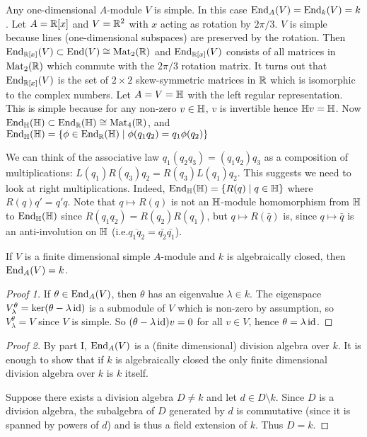\begin{exam}
	\leavevmode
	\begin{enum}
		\io Any one-dimensional $A$-module $V$ is simple.
		In this case $\operatorname{End}_A(V) = \operatorname{End}_k(V) = k$.
		\io Let $A=\mathbb{R}[x]$ and $V=\mathbb{R}^2$ with $x$ acting as rotation by $2\pi/3$.
		$V$ is simple because lines (one-dimensional subspaces) are preserved by the rotation.
		Then $\operatorname{End}_{\mathbb{R}[x]}(V) \subset \operatorname{End}(V) \cong \operatorname{Mat}_2(\mathbb{R})$ and $\operatorname{End}_{\mathbb{R}[x]}(V)$ consists of all matrices in $\operatorname{Mat}_2(\mathbb{R})$ which commute with the $2\pi/3$ rotation matrix.
		It turns out that $\operatorname{End}_{\mathbb{R}[x]}(V)$ is the set of $2 \times 2$ skew-symmetric matrices in $\mathbb{R}$ which is isomorphic to the complex numbers.
		\io Let $A=V=\mathbb{H}$ with the left regular representation.
		This is simple because for any non-zero $v \in \mathbb{H}$, $v$ is invertible hence $\mathbb{H} v = \mathbb{H}$.
		Now $\operatorname{End}_{\mathbb{H}}(\mathbb{H}) \subset \operatorname{End}_{\mathbb{R}}(\mathbb{H}) \cong \operatorname{Mat}_4(\mathbb{R})$, and $\operatorname{End}_{\mathbb{H}}(\mathbb{H}) = \{\phi \in \operatorname{End}_{\mathbb{R}}(\mathbb{H}) \mid \phi(q_1q_2) = q_1\phi(q_2)\}$
		
		We can think of the associative law $q_1(q_2q_3)=(q_1q_2)q_3$ as a composition of multiplications: $L(q_1)R(q_3)q_2=R(q_3)L(q_1)q_2$.
		This suggests we need to look at right multiplications.
		Indeed, $\operatorname{End}_{\mathbb{H}}(\mathbb{H}) = \{R(q) \mid q \in \mathbb{H}\}$ where $R(q)q' = q'q$.
		Note that $q \mapsto R(q)$ is not an $\mathbb{H}$-module homomorphism from $\mathbb{H}$ to $\operatorname{End}_{\mathbb{H}}(\mathbb{H})$ since $R(q_1q_2)=R(q_2)R(q_1)$, but $q \mapsto R(\bar{q})$ is, since $q \mapsto \bar q$ is an anti-involution on $\mathbb{H}$ (i.e.\@ $\overline{q_1q_2}=\bar{q_2}\bar{q_1}$).
	\end{enum}
\end{exam}

\begin{thm}
	If $V$ is a finite dimensional simple $A$-module and $k$ is algebraically closed, then $\operatorname{End}_A(V)=k$.
\end{thm}

\begin{proof}[Proof 1]
	If $\theta \in \operatorname{End}_A(V)$, then $\theta$ has an eigenvalue $\lambda \in k$.
	The eigenspace $V_\lambda^\theta = \ker(\theta-\lambda\operatorname{id})$ is a submodule of $V$ which is non-zero by assumption, so $V_\lambda^\theta=V$ since $V$ is simple.
	So $(\theta-\lambda\operatorname{id})v=0$ for all $v \in V$, hence $\theta=\lambda\operatorname{id}$.
\end{proof}

\begin{proof}[Proof 2]
	By part I, $\operatorname{End}_A(V)$ is a (finite dimensional) division algebra over $k$.
	It is enough to show that if $k$ is algebraically closed the only finite dimensional division algebra over $k$ is $k$ itself.
	
	Suppose there exists a division algebra $D \neq k$ and let $d \in D \setminus k$.
	Since $D$ is a division algebra, the subalgebra of $D$ generated by $d$ is commutative (since it is spanned by powers of $d$) and is thus a field extension of $k$.
	Thus $D=k$.
\end{proof}

